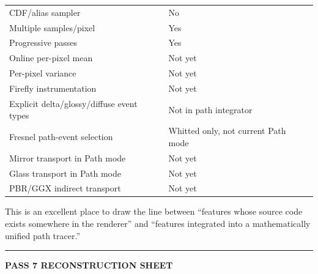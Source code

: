 {\begin{longtable}[]{@{}
  >{\raggedright\arraybackslash}p{}
  >{\raggedright\arraybackslash}p{}@{}}
CDF/alias sampler & No \\
Multiple samples/pixel & Yes \\
Progressive passes & Yes \\
Online per-pixel mean & Not yet \\
Per-pixel variance & Not yet \\
Firefly instrumentation & Not yet \\
Explicit delta/glossy/diffuse event types & Not in path integrator \\
Fresnel path-event selection & Whitted only, not current Path mode \\
Mirror transport in Path mode & Not yet \\
Glass transport in Path mode & Not yet \\
PBR/GGX indirect transport & Not yet \\
\end{longtable}
}

This is an excellent place to draw the line between ``features whose source code exists somewhere in the renderer'' and ``features integrated into a mathematically unified path tracer.''

\begin{center}\rule{0.5\linewidth}{0.5pt}\end{center}

\textbf{PASS 7 RECONSTRUCTION SHEET}

